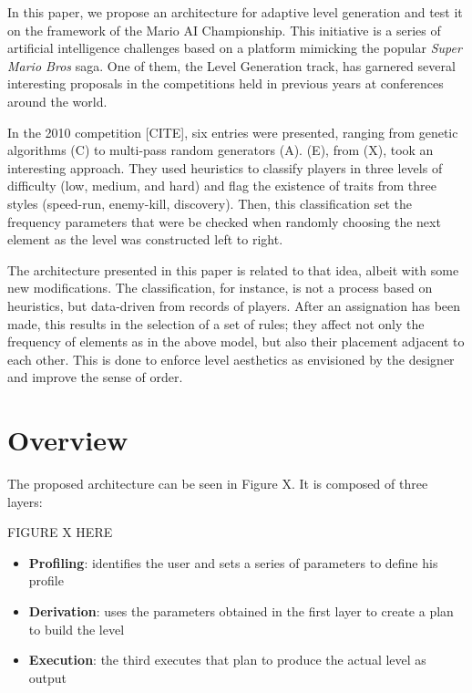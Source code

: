 \documentclass[conference]{IEEEtran}
\begin{document}
In this paper, we propose an architecture for adaptive level generation and test it on the framework of the Mario AI Championship. This initiative is a series of artificial intelligence challenges based on a platform mimicking the popular \textit{Super Mario Bros} saga. One of them, the Level Generation track, has garnered several interesting proposals in the competitions held in previous years at conferences around the world.

In the 2010 competition [CITE], six entries were presented, ranging from genetic algorithms (C) to multi-pass random generators (A). (E), from (X), took an interesting approach. They used heuristics to classify players in three levels of difficulty (low, medium, and hard) and flag the existence of traits from three styles (speed-run, enemy-kill, discovery). Then, this classification set the frequency parameters that were be checked when randomly choosing the next element as the level was constructed left to right.

The architecture presented in this paper is related to that idea, albeit with some new modifications. The classification, for instance, is not a process based on heuristics, but data-driven from records of players. After an assignation has been made, this results in the selection of a set of rules; they affect not only the frequency of elements as in the above model, but also their placement adjacent to each other. This is done to enforce level aesthetics as envisioned by the designer and improve the sense of order.





\section{Overview}

The proposed architecture can be seen in Figure X. It is composed of three layers:

FIGURE X HERE

\begin{itemize}
	
\item \textbf{Profiling}: identifies the user and sets a series of parameters to define his profile

\item \textbf{Derivation}: uses the parameters obtained in the first layer to create a plan to build the level

\item \textbf{Execution}: the third executes that plan to produce the actual level as output

\end{itemize}
\end{document}
